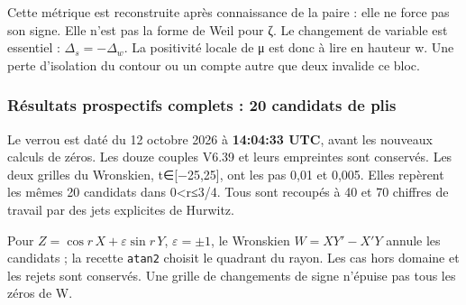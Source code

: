 \documentclass[
  10pt,
  a4paper,
]{article}
\begin{document}
Cette métrique est reconstruite après connaissance de la paire : elle ne
force pas son signe. Elle n'est pas la forme de Weil pour ζ. Le
changement de variable est essentiel : \(\Delta_s=-\Delta_w\). La
positivité locale de μ est donc à lire en hauteur w. Une perte
d'isolation du contour ou un compte autre que deux invalide ce bloc.

\hypertarget{ruxe9sultats-prospectifs-complets-20-candidats-de-plis}{%
\subsubsection{Résultats prospectifs complets : 20 candidats de
plis}\label{ruxe9sultats-prospectifs-complets-20-candidats-de-plis}}

Le verrou est daté du 12 octobre 2026 à \textbf{14:04:33 UTC}, avant les
nouveaux calculs de zéros. Les douze couples V6.39 et leurs empreintes
sont conservés. Les deux grilles du Wronskien, t∈{[}−25,25{]}, ont les
pas 0,01 et 0,005. Elles repèrent les mêmes 20 candidats dans
0\textless r≤3/4. Tous sont recoupés à 40 et 70 chiffres de travail par
des jets explicites de Hurwitz.

Pour \(Z=\cos r\,X+\varepsilon\sin r\,Y\), \(\varepsilon=\pm1\), le
Wronskien \(W=XY'-X'Y\) annule les candidats ; la recette \texttt{atan2}
choisit le quadrant du rayon. Les cas hors domaine et les rejets sont
conservés. Une grille de changements de signe n'épuise pas tous les
zéros de W.

\begingroup
\renewcommand{\arraystretch}{0.85}
\end{document}
